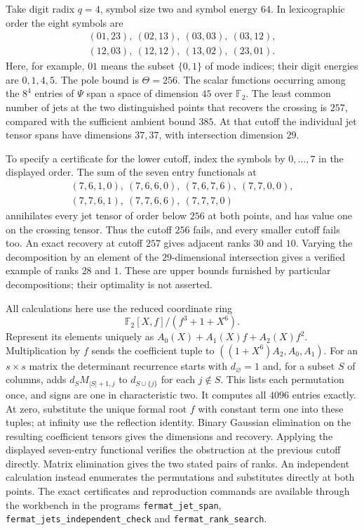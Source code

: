 \begin{example}\label{ex:fermat-jet-test}
Take digit radix $q=4$, symbol size two and symbol energy $64$.
In lexicographic order the eight symbols are
\[
\begin{gathered}
 (01,23),\ (02,13),\ (03,03),\ (03,12),\\
 (12,03),\ (12,12),\ (13,02),\ (23,01).
\end{gathered}
\]
Here, for example, $01$ means the subset $\{0,1\}$ of mode
indices; their digit energies are $0,1,4,5$.
The pole bound is $\Theta=256$.
The scalar functions occurring among the $8^4$ entries of $\Psi$
span a space of dimension $45$ over $\mathbb F_2$.
The least common number of jets at the two distinguished points
that recovers the crossing is $257$, compared with the sufficient
ambient bound $385$. At that cutoff the individual jet tensor
spans have dimensions $37,37$, with intersection dimension $29$.

To specify a certificate for the lower cutoff, index the symbols
by $0,\ldots,7$ in the displayed order. The sum of the seven entry
functionals at
\[
\begin{gathered}
 (7,6,1,0),\ (7,6,6,0),\ (7,6,7,6),\ (7,7,0,0),\\
 (7,7,6,1),\ (7,7,6,6),\ (7,7,7,0)
\end{gathered}
\]
annihilates every jet tensor of order below $256$ at both
points, and has value one on the crossing tensor.
Thus the cutoff $256$ fails, and every smaller cutoff fails too.
An exact recovery at cutoff $257$ gives adjacent ranks $30$ and
$10$. Varying the decomposition by an element of the
$29$-dimensional intersection gives a verified example of ranks
$28$ and $1$. These are upper bounds furnished by particular
decompositions; their optimality is not asserted.
\end{example}

All calculations here use the reduced coordinate ring
\[
 \mathbb F_2[X,f]/(f^3+1+X^6).
\]
Represent its elements uniquely as $A_0(X)+A_1(X)f+A_2(X)f^2$.
Multiplication by $f$ sends the coefficient tuple to
$((1+X^6)A_2,A_0,A_1)$.
For an $s\times s$ matrix the determinant recurrence starts
with $d_\varnothing=1$ and, for a subset $S$ of columns, adds
$d_S M_{|S|+1,j}$ to $d_{S\cup\{j\}}$ for each $j\notin S$.
This lists each permutation once, and signs are one in
characteristic two. It computes all $4096$ entries exactly.
At zero, substitute the unique formal root $f$ with constant
term one into these tuples; at infinity use the reflection
identity. Binary Gaussian elimination on the resulting coefficient
tensors gives the dimensions and recovery. Applying the displayed
seven-entry functional verifies the obstruction at the previous
cutoff directly. Matrix elimination gives the two stated pairs
of ranks. An independent calculation instead enumerates the
permutations and substitutes directly at both points.
The exact certificates and reproduction commands are available through
the workbench in the programs \texttt{fermat\_jet\_span},
\texttt{fermat\_jets\_independent\_check} and
\texttt{fermat\_rank\_search}.

